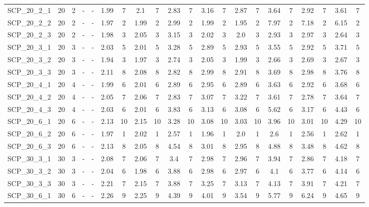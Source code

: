 \begin{sidewaystable}[!ht]
{\begin{tabular}{lcccccccccccccccccccc}
SCP\_20\_2\_1 & 20 & 2 &  - &  - & 1.99 & 7 & 2.1 & 7 & 2.83 & 7 & 3.16 & 7 & 2.87 & 7 & 3.64 & 7 & 2.92 & 7 & 3.61 & 7 \\
SCP\_20\_2\_2 & 20 & 2 &  - &  - & 1.97 & 2 & 1.99 & 2 & 2.99 & 2 & 1.99 & 2 & 1.95 & 2 & 7.97 & 2 & 7.18 & 2 & 6.15 & 2 \\
SCP\_20\_2\_3 & 20 & 2 &  - &  - & 1.98 & 3 & 2.05 & 3 & 3.15 & 3 & 2.02 & 3 & 2.0 & 3 & 2.93 & 3 & 2.97 & 3 & 2.64 & 3 \\
SCP\_20\_3\_1 & 20 & 3 &  - &  - & 2.03 & 5 & 2.01 & 5 & 3.28 & 5 & 2.89 & 5 & 2.93 & 5 & 3.55 & 5 & 2.92 & 5 & 3.71 & 5 \\
SCP\_20\_3\_2 & 20 & 3 &  - &  - & 1.94 & 3 & 1.97 & 3 & 2.74 & 3 & 2.05 & 3 & 1.99 & 3 & 2.66 & 3 & 2.69 & 3 & 2.67 & 3 \\
SCP\_20\_3\_3 & 20 & 3 &  - &  - & 2.11 & 8 & 2.08 & 8 & 2.82 & 8 & 2.99 & 8 & 2.91 & 8 & 3.69 & 8 & 2.98 & 8 & 3.76 & 8 \\
SCP\_20\_4\_1 & 20 & 4 &  - &  - & 1.99 & 6 & 2.01 & 6 & 2.89 & 6 & 2.95 & 6 & 2.89 & 6 & 3.63 & 6 & 2.92 & 6 & 3.68 & 6 \\
SCP\_20\_4\_2 & 20 & 4 &  - &  - & 2.05 & 7 & 2.06 & 7 & 2.83 & 7 & 3.07 & 7 & 3.22 & 7 & 3.61 & 7 & 2.78 & 7 & 3.64 & 7 \\
SCP\_20\_4\_3 & 20 & 4 &  - &  - & 2.03 & 6 & 2.01 & 6 & 3.83 & 6 & 3.13 & 6 & 3.08 & 6 & 5.62 & 6 & 3.17 & 6 & 4.43 & 6 \\
SCP\_20\_6\_1 & 20 & 6 &  - &  - & 2.13 & 10 & 2.15 & 10 & 3.28 & 10 & 3.08 & 10 & 3.03 & 10 & 3.96 & 10 & 3.01 & 10 & 4.29 & 10 \\
SCP\_20\_6\_2 & 20 & 6 &  - &  - & 1.97 & 1 & 2.02 & 1 & 2.57 & 1 & 1.96 & 1 & 2.0 & 1 & 2.6 & 1 & 2.56 & 1 & 2.62 & 1 \\
SCP\_20\_6\_3 & 20 & 6 &  - &  - & 2.13 & 8 & 2.05 & 8 & 4.54 & 8 & 3.01 & 8 & 2.95 & 8 & 4.88 & 8 & 3.48 & 8 & 4.62 & 8 \\
SCP\_30\_3\_1 & 30 & 3 &  - &  - & 2.08 & 7 & 2.06 & 7 & 3.4 & 7 & 2.98 & 7 & 2.96 & 7 & 3.94 & 7 & 2.86 & 7 & 4.18 & 7 \\
SCP\_30\_3\_2 & 30 & 3 &  - &  - & 2.04 & 6 & 1.98 & 6 & 3.88 & 6 & 2.98 & 6 & 2.97 & 6 & 4.1 & 6 & 3.77 & 6 & 4.14 & 6 \\
SCP\_30\_3\_3 & 30 & 3 &  - &  - & 2.21 & 7 & 2.15 & 7 & 3.88 & 7 & 3.25 & 7 & 3.13 & 7 & 4.13 & 7 & 3.91 & 7 & 4.21 & 7 \\
SCP\_30\_6\_1 & 30 & 6 &  - &  - & 2.26 & 9 & 2.25 & 9 & 4.39 & 9 & 4.01 & 9 & 3.54 & 9 & 5.77 & 9 & 6.24 & 9 & 4.65 & 9 \\

\end{tabular}}
\end{sidewaystable}
